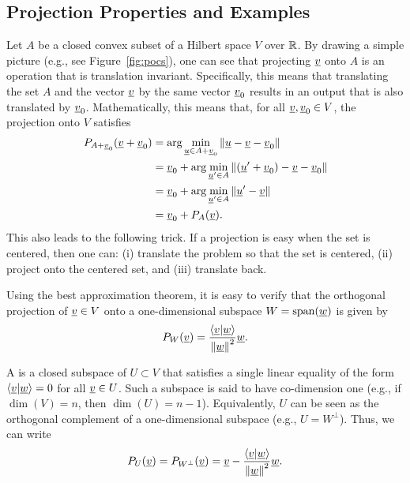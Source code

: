 \subsection{Projection Properties and Examples}

Let $A$ be a closed convex subset of a Hilbert space $V$ over $\mathbb{R}$.
By drawing a simple picture (e.g., see Figure~\ref{fig:pocs}), one can see that projecting $\underline{v}$ onto $A$ is an operation that is translation invariant.
Specifically, this means that translating the set $A$ and the vector $\underline v$ by the same vector $\underline v_{0}$ results in an output that is also translated by $\underline v_{0}$.
Mathematically, this means that, for all $\underline v,\underline v_{0}\in V$, the projection onto $V$ satisfies
\begin{align*}
P_{A+\underline v_{0}}(\underline v+\underline v_{0}) & =\arg\min_{\underline u\in A+\underline v_{0}}\left\Vert \underline u-\underline v-\underline v_{0}\right\Vert \nonumber \\
 & =\underline v_{0}+\arg\min_{\underline u'\in A}\left\Vert (\underline u'+\underline v_{0})-\underline v-\underline v_{0}\right\Vert \nonumber \\
 & =\underline v_{0}+\arg\min_{\underline u'\in A}\left\Vert \underline u'-\underline v\right\Vert \nonumber \\
 & =\underline v_{0}+P_{A}(\underline v).\label{eq:proj_trans}
\end{align*}
This also leads to the following trick. If a projection is easy when the set is centered, then one can: (i) translate the problem so that the set is centered, (ii) project onto the centered set, and (iii) translate back. 

Using the best approximation theorem, it is easy to verify that the orthogonal projection of $\underline v\in V$ onto a one-dimensional subspace $W=\text{span}(\underline w)$ is given by
\[
P_{W}(\underline v)=\frac{\left\langle \underline v|\underline w\right\rangle }{\left\Vert \underline w\right\Vert ^{2}}\underline w.
\]

A  is a closed subspace of $U \subset V$ that satisfies a single linear equality of the form $\left\langle \underline v|\underline w\right\rangle =0$ for all $\underline{v}\in U$.
Such a subspace is said to have co-dimension one (e.g., if $\dim(V)=n$, then $\dim(U) = n-1$). Equivalently, $U$ can be seen as the orthogonal complement of a one-dimensional subspace (e.g., $U=W^{\perp}$).
Thus, we can write
\[
P_{U}(\underline v)=P_{W^{\perp}}(\underline v)=\underline v-\frac{\left\langle \underline v|\underline w\right\rangle }{\left\Vert \underline w\right\Vert ^{2}}\underline w.
\]

